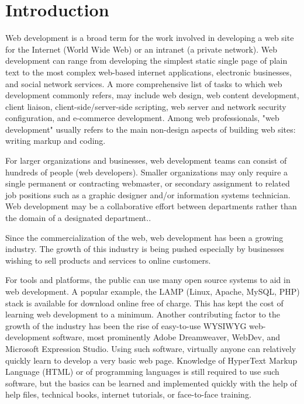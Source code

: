 \part{Introduction}



Web development\cite{web_development} is a broad term for the work involved in developing a web site for the Internet (World Wide Web) or an intranet (a private network). Web development can range from developing the simplest static single page of plain text to the most complex web-based internet applications, electronic businesses, and social network services. A more comprehensive list of tasks to which web development commonly refers, may include web design, web content development, client liaison, client-side/server-side scripting, web server and network security configuration, and e-commerce development. Among web professionals, "web development" usually refers to the main non-design aspects of building web sites: writing markup and coding.

For larger organizations and businesses, web development teams can consist of hundreds of people (web developers). Smaller organizations may only require a single permanent or contracting webmaster, or secondary assignment to related job positions such as a graphic designer and/or information systems technician. Web development may be a collaborative effort between departments rather than the domain of a designated department..

Since the commercialization of the web, web development has been a growing industry. The growth of this industry is being pushed especially by businesses wishing to sell products and services to online customers.


For tools and platforms, the public can use many open source systems to aid in web development. A popular example, the LAMP (Linux, Apache, MySQL, PHP) stack is available for download online free of charge. This has kept the cost of learning web development to a minimum. Another contributing factor to the growth of the industry has been the rise of easy-to-use WYSIWYG web-development software, most prominently Adobe Dreamweaver, WebDev, and Microsoft Expression Studio. Using such software, virtually anyone can relatively quickly learn to develop a very basic web page. Knowledge of HyperText Markup Language (HTML) or of programming languages is still required to use such software, but the basics can be learned and implemented quickly with the help of help files, technical books, internet tutorials, or face-to-face training.

